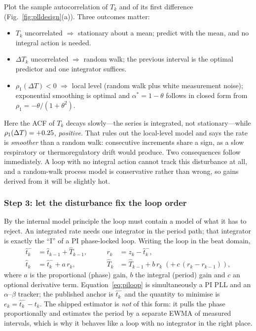 \documentclass[11pt]{article}
\begin{document}
Plot the sample autocorrelation of $T_k$ and of its first difference
(Fig.~\ref{fig:plldesign}(a)). Three outcomes matter:

\begin{itemize}\itemsep2pt
\item $T_k$ uncorrelated $\Rightarrow$ stationary about a mean; predict with the mean, and no
integral action is needed.
\item $\Delta T_k$ uncorrelated $\Rightarrow$ random walk; the previous interval is the optimal
predictor and one integrator suffices.
\item $\rho_1(\Delta T) < 0$ $\Rightarrow$ local level (random walk plus white measurement noise);
exponential smoothing is optimal and $\alpha^{*}=1-\theta$ follows in closed form from
$\rho_1 = -\theta/(1+\theta^{2})$.
\end{itemize}

Here the ACF of $T_k$ decays slowly---the series is integrated, not stationary---while
$\rho_1(\Delta T) = +0.25{}$, \emph{positive}. That rules out the local-level model and says the
rate is \emph{smoother} than a random walk: consecutive increments share a sign, as a slow
respiratory or thermoregulatory drift would produce. Two consequences follow immediately. A loop
with no integral action cannot track this disturbance at all, and a random-walk process model is
conservative rather than wrong, so gains derived from it will be slightly hot.

\subsubsection*{Step 3: let the disturbance fix the loop order}

By the internal model principle the loop must contain a model of what it has to reject. An
integrated rate needs one integrator in the period path; that integrator is exactly the ``I'' of a
PI phase-locked loop. Writing the loop in the beat domain,
\begin{equation}
\begin{aligned}
\hat{t}_k^{-} &= \hat{t}_{k-1} + \hat{T}_{k-1}, &\qquad
r_k &= z_k - \hat{t}_k^{-},\\
\hat{t}_k &= \hat{t}_k^{-} + a\,r_k, &\qquad
\hat{T}_k &= \hat{T}_{k-1} + b\,r_k \;(+\,c\,(r_k-r_{k-1})),
\end{aligned}
\label{eq:piloop}
\end{equation}
where $a$ is the proportional (phase) gain, $b$ the integral (period) gain and $c$ an optional
derivative term. Equation~\eqref{eq:piloop} is simultaneously a PI PLL and an $\alpha$--$\beta$
tracker; the published anchor is $\hat{t}_k^{-}$ and the quantity to minimise is
$e_k = \hat{t}_k^{-} - t_k$. The shipped estimator is \emph{not} of this form: it pulls the phase
proportionally and estimates the period by a separate EWMA of measured intervals, which is why it
behaves like a loop with no integrator in the right place.
\end{document}
